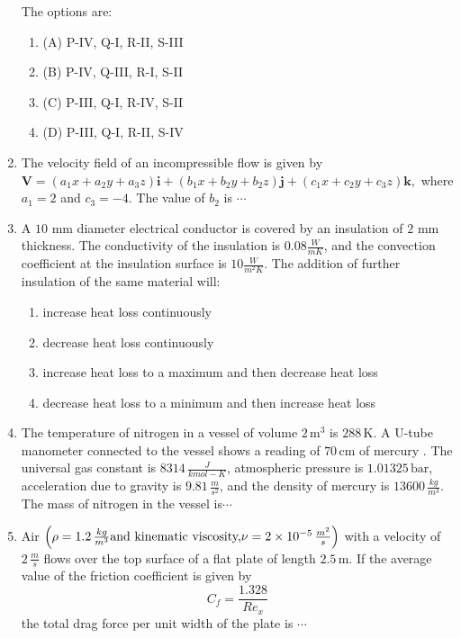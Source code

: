\documentclass[journal,12pt,twocolumn]{IEEEtran}
\theoremstyle{remark}
\begin{document}
\begin{enumerate}[start=53]
    The options are:
    \begin{enumerate}
        \item (A) P-IV, Q-I, R-II, S-III
        \item (B) P-IV, Q-III, R-I, S-II
        \item (C) P-III, Q-I, R-IV, S-II
        \item (D) P-III, Q-I, R-II, S-IV
    \end{enumerate}
    
 \item The velocity field of an incompressible flow is given by
    $
    \mathbf{V} = (a_1 x + a_2 y + a_3 z) \mathbf{i} + (b_1 x + b_2 y + b_2 z) \mathbf{j} + (c_1 x + c_2 y + c_3 z) \mathbf{k},
    $
    where $a_1 = 2$ and $c_3 = -4$. The value of $b_2$ is $\cdots$

 \item A $10$ mm diameter electrical conductor is covered by an insulation of $2$ mm thickness. The conductivity of the insulation is $0.08 \frac{W}{mK}$, and the convection coefficient at the insulation surface is $10 \frac{W}{m^2K}$. The addition of further insulation of the same material will:
    \begin{enumerate}
        \item  increase heat loss continuously
        \item  decrease heat loss continuously
        \item  increase heat loss to a maximum and then decrease heat loss
        \item  decrease heat loss to a minimum and then increase heat loss
    \end{enumerate}

 \item The temperature of nitrogen in a vessel of volume $2 \, \text{m}^3$ is $288 \, \text{K}$. A U-tube manometer connected to the vessel shows a reading of $70 \, \text{cm}$ of mercury . The universal gas constant is $8314 \, \frac{J}{kmol-K}$, atmospheric pressure is $1.01325 \, \text{bar}$, acceleration due to gravity is $9.81 \, \frac{m}{s^2}$, and the density of mercury is $13600 \, \frac{kg}{m^3}$. The mass of nitrogen  in the vessel is$\cdots$

 \item Air $\left(\rho = 1.2 \, \frac{kg}{m^3} \text{and kinematic viscosity,} \nu = 2 \times 10^{-5} \, \frac{m^2}{s}\right)$ with a velocity of $2 \, \frac{m}{s}$ flows over the top surface of a flat plate of length $2.5 \, \text{m}$. If the average value of the friction coefficient is given by
    \[
    C_f = \frac{1.328}{R{e_x}}
    \]
    the total drag force  per unit width of the plate is $\cdots$


\end{enumerate}
\end{document}
